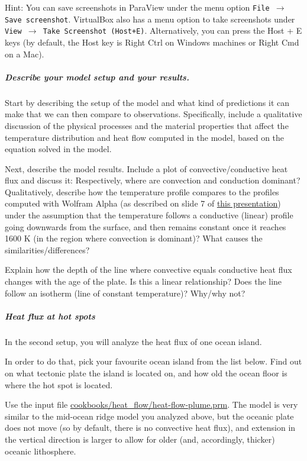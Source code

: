 Hint: You can save screenshots in ParaView under the menu option \texttt{File $\rightarrow$ Save screenshot}. VirtualBox also has a menu option to take screenshots under \texttt{View $\rightarrow$ Take Screenshot (Host+E)}. Alternatively, you can press the Host + E keys (by default, the Host key is Right Ctrl on Windows machines or Right Cmd on a Mac). 

\subparagraph{Describe your model setup and your results.}
Start by describing the setup of the model and what kind of predictions it can make that we can then compare to observations. Specifically, include a qualitative discussion of the physical processes and the material properties that affect the temperature distribution and heat flow computed in the model, based on the equation solved in the model. 

Next, describe the model results. Include a plot of convective/conductive heat flux and discuss it:
Respectively, where are convection and conduction dominant? 
Qualitatively, describe how the temperature profile compares to the profiles computed with Wolfram Alpha (as described on slide 7 of \href{https://www.dropbox.com/s/tdfj9pi2mdq0fhe/04_geophysics_lecture_01_13.pdf?dl=0}{this presentation}) under the assumption that the temperature follows a conductive (linear) profile going downwards from the surface, 
and then remains constant once it reaches 1600 K (in the region where convection is dominant)? 
What causes the similarities/differences?

Explain how the depth of the line where convective equals conductive heat flux changes with the age of the plate. 
Is this a linear relationship? Does the line follow an isotherm (line of constant temperature)? Why/why not?

\subparagraph{Heat flux at hot spots}

In the second setup, you will analyze the heat flux of one ocean island.

In order to do that, pick your favourite ocean island from the list below. Find out on what tectonic plate the island is located on, and how old the ocean floor is where the hot spot is located. 

Use the input file \url{cookbooks/heat_flow/heat-flow-plume.prm}. 
The model is very similar to the mid-ocean ridge model you analyzed above, but the oceanic plate does not move
(so by default, there is no convective heat flux), and extension in the vertical direction is larger 
to allow for older (and, accordingly, thicker) oceanic lithosphere. 

